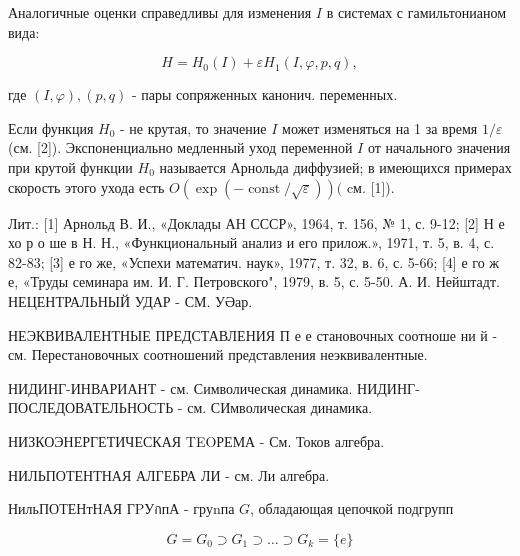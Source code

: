 \documentclass[10pt]{article}
\begin{document}
Аналогичные оценки справедливы для изменения $I$ в системах с гамильтонианом вида:



\[

H=H_{0}(I)+\varepsilon H_{1}(I, \varphi, p, q),

\]



где $(I, \varphi),(p, q)$ - пары сопряженных канонич. переменных.



Если функция $H_{0}$ - не крутая, то значение $I$ может изменяться на 1 за время $1 / \varepsilon$ (см. [2]). Экспоненциально медленный уход переменной $I$ от начального значения при крутой функции $H_{0}$ называется Арнольда диффузией; в имеющихся примерах скорость этого ухода есть $O(\exp (-\operatorname{const} / \sqrt{\varepsilon}))($ cм. [1]).



Лит.: [1] Арнольд В. И., «Доклады АН СССР», 1964, т. 156, № 1, с. 9-12; [2] Н е хо р о ше в Н. Н., «Функциональный анализ и его прилож.», 1971, т. 5, в. 4, с. 82-83; [3] е го же, «Успехи математич. наук», 1977, т. 32, в. 6, с. 5-66; [4] е го ж е, «Труды семинара им. И. Г. Петровского", 1979, в. 5, с. 5-50. А. И. Нейштадт. НЕЦЕНТРАЛЬНЫЙ УДАР - СМ. УӘар.



НЕЭКВИВАЛЕНТНЫЕ ПРЕДСТАВЛЕНИЯ П е е становочных соотноше ни й - см. Перестановочных соотношений представления неэквивалентные.



НИДИНГ-ИНВАРИАНТ - см. Символическая динамика. НИДИНГ-ПОСЛЕДОВАТЕЛЬНОСТЬ - см. СИмволическая динамика.



НИЗКОЭНЕРГЕТИЧЕСКАЯ TEOРЕМА - См. Токов алгебра.



НИЛЬПОТЕНТНАЯ АЛГЕБРА ЛИ - см. Ли алгебра.



НильПОТЕНтНАЯ ГPУกпА - груnпа $G$, обладающая цепочкой подгрупп



\[

G=G_{0} \supset G_{1} \supset \ldots \supset G_{k}=\{e\}

\]
\end{document}
